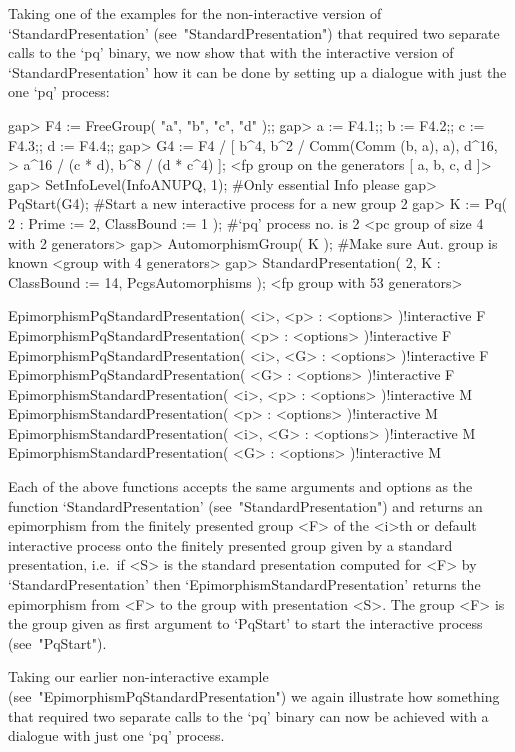 Taking  one  of  the  examples  for  the   non-interactive   version   of
`StandardPresentation'  (see~"StandardPresentation")  that  required  two
separate calls to the `pq' binary, we now show that with the  interactive
version of `StandardPresentation' how it can be  done  by  setting  up  a
dialogue with just the one `pq' process:

\beginexample
gap> F4 := FreeGroup( "a", "b", "c", "d" );;
gap> a := F4.1;; b := F4.2;; c := F4.3;; d := F4.4;;
gap> G4 := F4 / [ b^4, b^2 / Comm(Comm (b, a), a), d^16,
>                 a^16 / (c * d), b^8 / (d * c^4) ];
<fp group on the generators [ a, b, c, d ]>
gap> SetInfoLevel(InfoANUPQ, 1); #Only essential Info please
gap> PqStart(G4); #Start a new interactive process for a new group
2
gap> K := Pq( 2 : Prime := 2, ClassBound := 1 ); #`pq' process no. is 2
<pc group of size 4 with 2 generators>
gap> AutomorphismGroup( K );     #Make sure Aut. group is known
<group with 4 generators>
gap> StandardPresentation( 2, K : ClassBound := 14, PcgsAutomorphisms );
<fp group with 53 generators>
\endexample

\>EpimorphismPqStandardPresentation( <i>, <p> : <options> )!{interactive} F
\>EpimorphismPqStandardPresentation( <p> : <options> )!{interactive} F
\>EpimorphismPqStandardPresentation( <i>, <G> : <options> )!{interactive} F
\>EpimorphismPqStandardPresentation( <G> : <options> )!{interactive} F
\>EpimorphismStandardPresentation( <i>, <p> : <options> )!{interactive} M
\>EpimorphismStandardPresentation( <p> : <options> )!{interactive} M
\>EpimorphismStandardPresentation( <i>, <G> : <options> )!{interactive} M
\>EpimorphismStandardPresentation( <G> : <options> )!{interactive} M

Each of the above functions accepts the same arguments and options as the
function `StandardPresentation' (see~"StandardPresentation") and  returns
an epimorphism from the finitely presented group  <F>  of  the  <i>th  or
default interactive {\ANUPQ} process onto the  finitely  presented  group
given  by  a  standard  presentation,  i.e.~if  <S>   is   the   standard
presentation   computed   for   <F>   by   `StandardPresentation'    then
`EpimorphismStandardPresentation' returns the epimorphism from <F> to the
group with presentation <S>. The group <F> is the group  given  as  first
argument  to  `PqStart'  to  start  the  interactive   {\ANUPQ}   process
(see~"PqStart").

Taking        our         earlier         non-interactive         example
(see~"EpimorphismPqStandardPresentation")   we   again   illustrate   how
something that required two separate calls to the `pq' binary can now  be
achieved with a dialogue with just one `pq' process.


